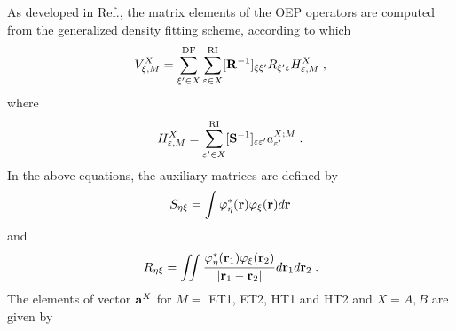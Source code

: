 As developed in Ref.\cite{Blasiak.Bednarska.Choluj.Bartkowiak.XXXX}, 
the matrix elements of the OEP operators
are computed from the generalized density fitting scheme, according to which
%
\begin{equation}
 V^X_{\xi, M} = \sum_{\xi'\in X}^{\rm DF} 
                \sum_{\varepsilon\in X}^{\rm RI}
                [{\bf R}^{-1}]_{\xi\xi'} R_{\xi'\varepsilon} H^X_{\varepsilon, M} \;,
\end{equation}
%
where
%
\begin{equation}
 H^X_{\varepsilon, M} = \sum_{\varepsilon'\in X}^{\rm RI}
                        [{\bf S}^{-1}]_{\varepsilon\varepsilon'} a_{\varepsilon'}^{X; M} \;.
\end{equation}
%
In the above equations, the auxiliary matrices are defined by
%
\begin{equation}
 S_{\eta\xi}  = \int 
                       \varphi^*_\eta({\bf r}) \varphi_\xi({\bf r}) 
                 d{\bf r} 
\end{equation}
%
and
%
\begin{equation}
 R_{\eta\xi}  = \iint 
                       \frac{ \varphi^*_\eta({\bf r}_1) \varphi_\xi({\bf r}_2) } 
                            {\vert {\bf r}_1 - {\bf r}_2\vert}  
                 d{\bf r}_1 d{\bf r}_2 \;.
\end{equation}
%
The elements of vector ${\bf a}^X$ for $M=$ ET1, ET2, HT1 and HT2 and $X=A, B$ are given by
%
